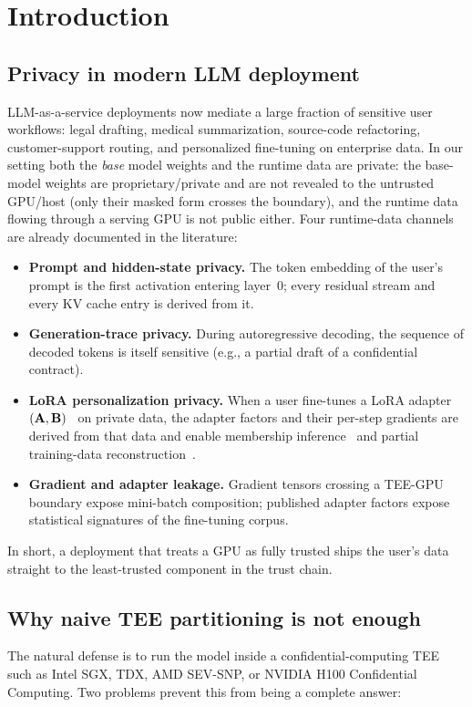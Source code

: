 \section{Introduction}
\label{sec:introduction}

\subsection{Privacy in modern LLM deployment}
LLM-as-a-service deployments now mediate a large fraction of sensitive user workflows: legal drafting, medical summarization, source-code refactoring, customer-support routing, and personalized fine-tuning on enterprise data. In our setting both the \emph{base} model weights and the runtime data are private: the base-model weights are proprietary/private and are not revealed to the untrusted GPU/host (only their masked form crosses the boundary), and the runtime data flowing through a serving GPU is not public either. Four runtime-data channels are already documented in the literature:

\begin{itemize}[leftmargin=*, nosep]
  \item \textbf{Prompt and hidden-state privacy.} The token embedding of the user's prompt is the first activation entering layer~$0$; every residual stream and every KV cache entry is derived from it.
  \item \textbf{Generation-trace privacy.} During autoregressive decoding, the sequence of decoded tokens is itself sensitive (e.g., a partial draft of a confidential contract).
  \item \textbf{LoRA personalization privacy.} When a user fine-tunes a LoRA adapter $(\mathbf{A}, \mathbf{B})$~\cite{hu2022lora} on private data, the adapter factors and their per-step gradients are derived from that data and enable membership inference~\cite{shokri2017membership} and partial training-data reconstruction~\cite{zhu2019dlg, zhao2020idlg, yin2021gradinversion}.
  \item \textbf{Gradient and adapter leakage.} Gradient tensors crossing a TEE-GPU boundary expose mini-batch composition; published adapter factors expose statistical signatures of the fine-tuning corpus.
\end{itemize}

In short, a deployment that treats a GPU as fully trusted ships the user's data straight to the least-trusted component in the trust chain.

\subsection{Why naive TEE partitioning is not enough}
The natural defense is to run the model inside a confidential-computing TEE such as Intel SGX, TDX, AMD SEV-SNP, or NVIDIA H100 Confidential Computing. Two problems prevent this from being a complete answer:

